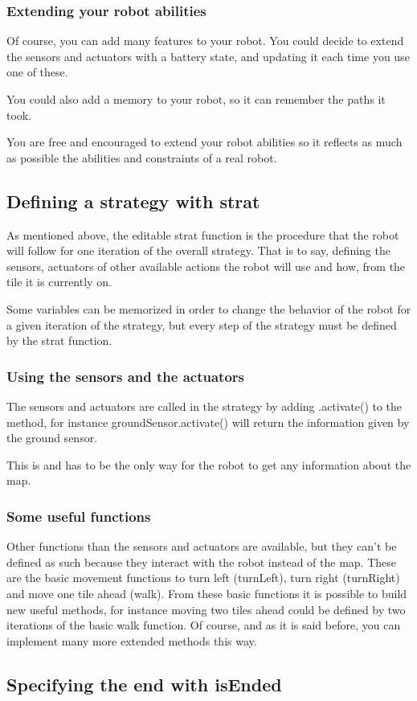 \documentclass[a4paper,11pt]{article}
\begin{document}
\subsubsection{Extending your robot abilities}

Of course, you can add many features to your robot. You could decide
to extend the sensors and actuators with a battery state, and updating
it each time you use one of these.

You could also add a memory to your robot, so it can remember the
paths it took.

You are free and encouraged to extend your robot abilities so it
reflects as much as possible the abilities and constraints of a real
robot.

\subsection{Defining a strategy with strat}
As mentioned above, the editable strat function is the procedure 
that the robot will follow for one iteration of the overall strategy.
That is to say, defining the sensors, actuators of other available actions 
the robot will use and how, from the tile it is currently on.

Some variables can be memorized in order to change the behavior of the robot for a given iteration 
of the strategy, but every step of the strategy must be defined by the strat function.

\subsubsection{Using the sensors and the actuators}
The sensors and actuators are called in the strategy by adding .activate() to the method,
for instance groundSensor.activate() will return the information given by the ground sensor.

This is and has to be the only way for the robot to get any information about the map.

\subsubsection{Some useful functions}
Other functions than the sensors and actuators are available, but they can't be defined as such
because they interact with the robot instead of the map. These are the basic movement functions
to turn left (turnLeft), turn right (turnRight) and move one tile ahead (walk). From these basic 
functions it is possible to build new useful methods, for instance moving two tiles ahead could 
be defined by two iterations of the basic walk function. Of course, and as it is said before, 
you can implement many more extended methods this way.

\subsection{Specifying the end with isEnded}
\end{document}
